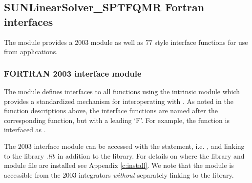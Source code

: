 \subsection{SUNLinearSolver\_SPTFQMR Fortran interfaces}
\label{ss:sunlinsol_sptfqmr_fortran}

The {\sunlinsolspfgmr} module provides a {\F} 2003 module as well as {\F} 77
style interface functions for use from {\F} applications.

\subsubsection*{FORTRAN 2003 interface module}
The  {\F} module defines interfaces to all
{\sunlinsolspfgmr} {\CC} functions using the intrinsic 
module which provides a standardized mechanism for interoperating with {\CC}. As
noted in the {\CC} function descriptions above, the interface functions are
named after the corresponding {\CC} function, but with a leading `F'. For
example, the function  is interfaced as
.

The {\F} 2003 {\sunlinsolspfgmr} interface module can be accessed with the 
statement, i.e. , and linking to the library
.{\em lib} in addition to the {\CC} library.
For details on where the library and module file
 are installed see Appendix \ref{c:install}.
We note that the module is accessible from the {\F} 2003 {\sundials} integrators
\textit{without} separately linking to the
 library.

